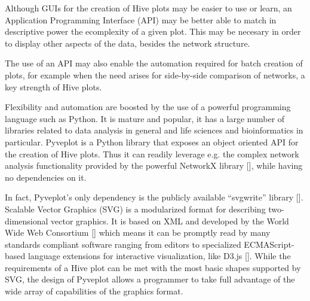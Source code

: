 \documentclass{bioinfo}
\begin{document}
Although GUIs for the creation of Hive plots may be easier to use or
learn, an Application Programming Interface (API) may be better able
to match in descriptive power the ecomplexity of a given plot. This
may be necesary in order to display other aspects of the data, besides
the network structure.

The use of an API may also enable the automation required for batch
creation of plots, for example when the need arises for side-by-side
comparison of networks, a key strength of Hive plots.

Flexibility and automation are boosted by the use of a powerful
programming language such as Python. It is mature and popular, it has
a large number of libraries related to data analysis in general and
life sciences and bioinformatics in particular. Pyveplot is a Python
library that exposes an object oriented API for the creation of Hive
plots. Thus it can readily leverage e.g. the complex network analysis
functionality provided by the powerful NetworkX library
[\cite{hagberg-2008-exploring}], while having no dependencies on it.

In fact, Pyveplot's only dependency is the publicly available
``svgwrite'' library [\cite{svgwrite}]. Scalable Vector Graphics (SVG)
is a modularized format for describing two-dimensional vector
graphics. It is based on XML and developed by the World Wide Web
Consortium [\cite{McCormack:11:SVG}] which means it can be promptly
read by many standards compliant software ranging from editors to
specialized ECMAScript-based language extensions for interactive
visualization, like D3.js [\cite{bostock2011d3}]. While the
requirements of a Hive plot can be met with the most basic shapes
supported by SVG, the design of Pyveplot allows a programmer to take
full advantage of the wide array of capabilities of the graphics
format.
\end{document}
